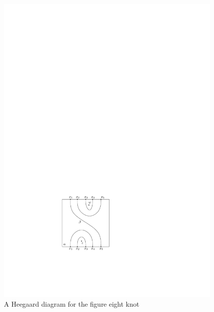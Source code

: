 \begin{example}

\begin{figure}[tb]
\centering
\includegraphics[scale=1]{graphics/figure-eight-heegaard-diagram}
\caption{A Heegaard diagram for the figure eight knot}
\label{figure-eight-heegaard-diagram}
\end{figure}


\end{example}
